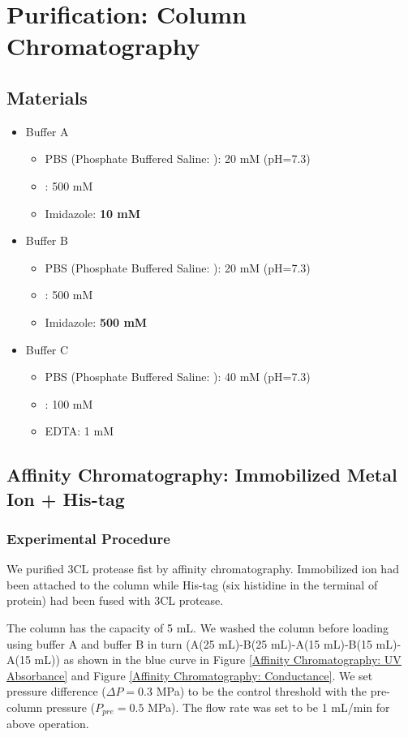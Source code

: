 \documentclass{report}
\begin{document}
\section{Purification: Column Chromatography}

\subsection{Materials}
\begin{itemize}
    \item Buffer A
    \begin{itemize}
        \item PBS (Phosphate Buffered Saline: ): 20 mM (pH=7.3)
        \item {}: 500 mM
        \item Imidazole: \textbf{10 mM}
    \end{itemize}
    \item Buffer B
    \begin{itemize}
        \item PBS (Phosphate Buffered Saline: ): 20 mM (pH=7.3)
        \item {}: 500 mM
        \item Imidazole: \textbf{500 mM}
    \end{itemize}
    \item Buffer C
    \begin{itemize}
        \item PBS (Phosphate Buffered Saline: ): 40 mM (pH=7.3)
        \item {}: 100 mM
        \item EDTA: 1 mM
    \end{itemize}
\end{itemize}
\subsection{Affinity Chromatography: Immobilized  Metal Ion + His-tag}
\subsubsection{Experimental Procedure}
We purified 3CL protease fist by affinity chromatography.
Immobilized  ion had been attached to the column while His-tag (six histidine in the terminal of protein) had been fused with 3CL protease.

The  column has the capacity of 5 mL.
We washed the column before loading using buffer A and buffer B in turn (A(25 mL)-B(25 mL)-A(15 mL)-B(15 mL)-A(15 mL)) as shown in the blue curve in Figure \ref{Affinity Chromatography: UV Absorbance} and Figure \ref{Affinity Chromatography: Conductance}.
We set pressure difference ($\Delta P=0.3$ MPa) to be the control threshold with the pre-column pressure ($P_{pre}=0.5$ MPa).
The flow rate was set to be 1 mL/min for above operation.
\end{document}
